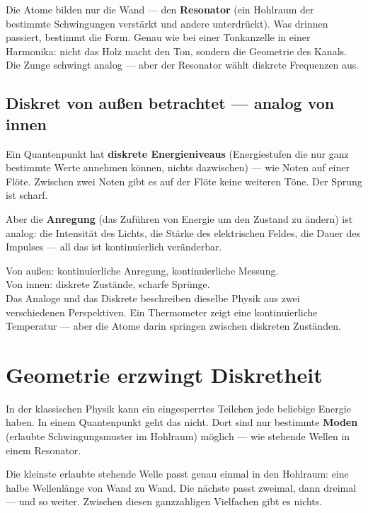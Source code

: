 Die Atome bilden nur die Wand --- den \textbf{Resonator}
(ein Hohlraum der bestimmte Schwingungen verstärkt und andere unterdrückt).
Was drinnen passiert, bestimmt die Form. Genau wie bei einer
Tonkanzelle in einer Harmonika: nicht das Holz macht den Ton,
sondern die Geometrie des Kanals. Die Zunge schwingt analog ---
aber der Resonator wählt diskrete Frequenzen aus.

\subsection{Diskret von außen betrachtet --- analog von innen}

Ein Quantenpunkt hat \textbf{diskrete Energieniveaus}
(Energiestufen die nur ganz bestimmte Werte annehmen können,
nichts dazwischen) --- wie Noten auf einer Flöte.
Zwischen zwei Noten gibt es auf der Flöte keine weiteren Töne.
Der Sprung ist scharf.

Aber die \textbf{Anregung} (das Zuführen von Energie um den Zustand
zu ändern) ist analog: die Intensität des Lichts, die Stärke des
elektrischen Feldes, die Dauer des Impulses --- all das ist
kontinuierlich veränderbar.

\begin{keypoint}
Von außen: kontinuierliche Anregung, kontinuierliche Messung.\\
Von innen: diskrete Zustände, scharfe Sprünge.\\[4pt]
Das Analoge und das Diskrete beschreiben dieselbe Physik
aus zwei verschiedenen Perspektiven.
Ein Thermometer zeigt eine kontinuierliche Temperatur ---
aber die Atome darin springen zwischen diskreten Zuständen.
\end{keypoint}

\section{Geometrie erzwingt Diskretheit}
\label{sec:geometrie}

In der klassischen Physik kann ein eingesperrtes Teilchen
jede beliebige Energie haben. In einem Quantenpunkt geht
das nicht. Dort sind nur bestimmte \textbf{Moden}
(erlaubte Schwingungsmuster im Hohlraum) möglich ---
wie stehende Wellen in einem Resonator.

Die kleinste erlaubte stehende Welle passt genau einmal
in den Hohlraum: eine halbe Wellenlänge von Wand zu Wand.
Die nächste passt zweimal, dann dreimal --- und so weiter.
Zwischen diesen ganzzahligen Vielfachen gibt es nichts.

